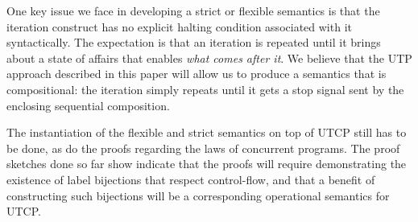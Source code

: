One key issue we face in developing a strict or flexible semantics
is that the iteration construct has no explicit halting condition
associated with it syntactically.
The expectation is that an iteration is repeated until it brings
about a state of affairs that enables \emph{what comes after it}.
%
We believe that the UTP approach described in this paper will allow us
to produce a semantics that is compositional:
the iteration simply repeats until it gets a stop signal
sent by the enclosing sequential composition.

The instantiation of the flexible and strict semantics on top of UTCP
still has to be done,
as do the proofs regarding the laws of concurrent programs.
The proof sketches done so far show indicate that
the proofs will require demonstrating the existence
of label bijections that respect control-flow,
and that a benefit of constructing such bijections
will be a corresponding operational semantics for UTCP.

